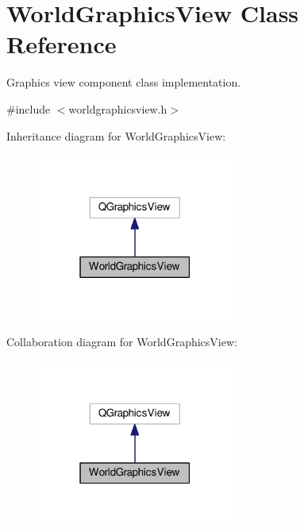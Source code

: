 \hypertarget{classWorldGraphicsView}{}\section{World\+Graphics\+View Class Reference}
\label{classWorldGraphicsView}


Graphics view component class implementation.  




{\ttfamily \#include $<$worldgraphicsview.\+h$>$}



Inheritance diagram for World\+Graphics\+View\+:\nopagebreak
\begin{figure}[H]
\begin{center}
\leavevmode
\includegraphics[width=183pt]{d8/d05/classWorldGraphicsView__inherit__graph}
\end{center}
\end{figure}


Collaboration diagram for World\+Graphics\+View\+:\nopagebreak
\begin{figure}[H]
\begin{center}
\leavevmode
\includegraphics[width=183pt]{d9/d69/classWorldGraphicsView__coll__graph}
\end{center}
\end{figure}
